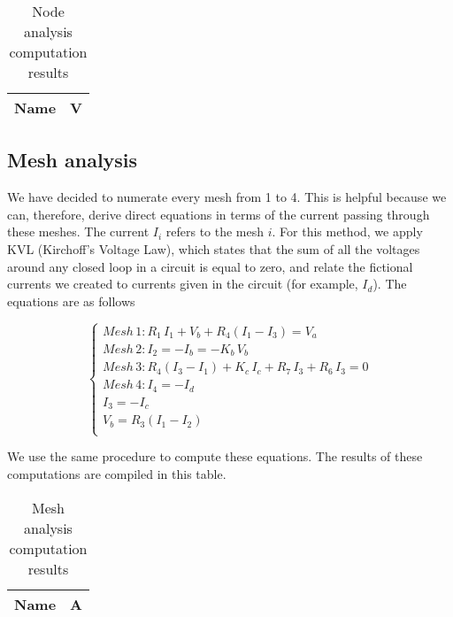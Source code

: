 \begin{table}[h]
  \centering
  \begin{tabular}{|l|r|}
    \hline    
    {\bf Name} & {\bf V} \\ \hline
    
  \end{tabular}
  \caption{Node analysis computation results}
  \label{tab:op}
\end{table}

\subsection{Mesh analysis}

We have decided to numerate every mesh from 1 to 4. This is helpful because we can, therefore, derive direct equations in terms of the current passing through these meshes. The current $I_i$ refers to the mesh $i$. For this method, we apply KVL (Kirchoff's Voltage Law), which states that the sum of all the voltages around any closed loop in a circuit is equal to zero, and relate the fictional currents we created to currents given in the circuit (for example, $I_d$). The equations are as follows

\begin{equation} 
\begin{cases}  
    Mesh\, 1: R_1\,I_1 + V_b + R_4(I_1 - I_3) = V_a \\
    Mesh\, 2: I_2 = -I_b = -K_b\, V_b\\
    Mesh\, 3: R_4(I_3 - I_1) + K_c\,I_c + R_7\,I_3 + R_6\,I_3 = 0 \\
    Mesh\, 4: I_4 = -I_d \\
    I_3 = -I_c \\
    V_b = R_3(I_1 - I_2) \\
    
    
\end{cases}
\label{eq:2}
\end{equation}

We use the same procedure to compute these equations. The results of these computations are compiled in this table.

\begin{table}[h]
  \centering
  \begin{tabular}{|l|r|}
    \hline    
    {\bf Name} & {\bf A} \\ \hline
    
  \end{tabular}
  \caption{Mesh analysis computation results}
  \label{tab:op}
\end{table}
